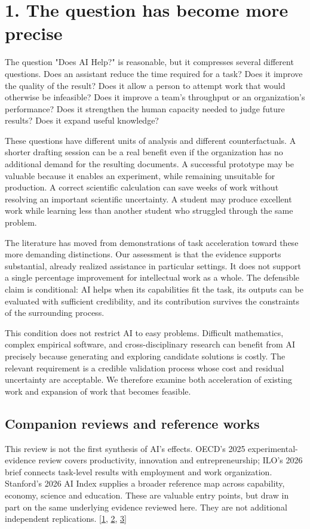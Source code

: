 
\section*{1. The question has become more precise}
The question "Does AI Help?" is reasonable, but it compresses several different questions. Does an assistant reduce the time required for a task? Does it improve the quality of the result? Does it allow a person to attempt work that would otherwise be infeasible? Does it improve a team's throughput or an organization's performance? Does it strengthen the human capacity needed to judge future results? Does it expand useful knowledge?


These questions have different units of analysis and different counterfactuals. A shorter drafting session can be a real benefit even if the organization has no additional demand for the resulting documents. A successful prototype may be valuable because it enables an experiment, while remaining unsuitable for production. A correct scientific calculation can save weeks of work without resolving an important scientific uncertainty. A student may produce excellent work while learning less than another student who struggled through the same problem.


The literature has moved from demonstrations of task acceleration toward these more demanding distinctions. Our assessment is that the evidence supports substantial, already realized assistance in particular settings. It does not support a single percentage improvement for intellectual work as a whole. The defensible claim is conditional: AI helps when its capabilities fit the task, its outputs can be evaluated with sufficient credibility, and its contribution survives the constraints of the surrounding process.


This condition does not restrict AI to easy problems. Difficult mathematics, complex empirical software, and cross-disciplinary research can benefit from AI precisely because generating and exploring candidate solutions is costly. The relevant requirement is a credible validation process whose cost and residual uncertainty are acceptable. We therefore examine both acceleration of existing work and expansion of work that becomes feasible.



\subsection*{Companion reviews and reference works}
This review is not the first synthesis of AI's effects. OECD's 2025 experimental-evidence review covers productivity, innovation and entrepreneurship; ILO's 2026 brief connects task-level results with employment and work organization. Stanford's 2026 AI Index supplies a broader reference map across capability, economy, science and education. These are valuable entry points, but draw in part on the same underlying evidence reviewed here. They are not additional independent replications. [\hyperlink{ref-oecdproductivity2025}{1}, \hyperlink{ref-iloreview2026}{2}, \hyperlink{ref-aiindex2026}{3}]


